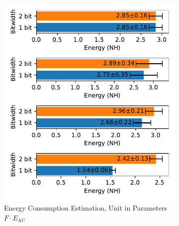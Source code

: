         \begin{figure}[!htpb]
            \centering
            \begin{subfigure}[H]{0.48\textwidth}
                \includegraphics[width=\textwidth]{../firerate/FashionMNIST/plots/fashionmnist_test_energy_nh.pdf}
                \caption{Energy Consumption Estimation, Unit in Parameters $F\cdot E_{\text{AC}}$}
            \end{subfigure}
            \hfill
            \begin{subfigure}[H]{0.48\textwidth}

\end{subfigure}
\end{figure}
